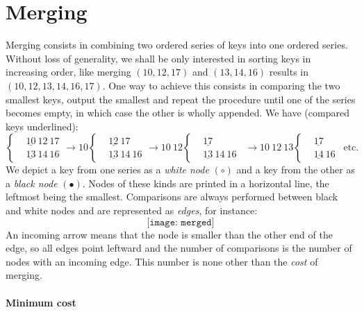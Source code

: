 \section{Merging}

Merging consists in combining two ordered series of keys into one
ordered series. Without loss of generality, we shall be only
interested in sorting keys in increasing order, like merging
\((10,12,17)\) and \((13,14,16)\) results in
\((10,12,13,14,16,17)\). One way to achieve this consists in comparing
the two smallest keys, output the smallest and repeat the procedure
until one of the series becomes empty, in which case the other is
wholly appended. We have (compared keys underlined):
\begin{equation*}
\left\{
\begin{aligned}
&\underline{10}~12~17\\
&\underline{13}~14~16
\end{aligned}
\right.
\rightarrow 10
\left\{
\begin{aligned}
&\underline{12}~17\\
&\underline{13}~14~16
\end{aligned}
\right.
\rightarrow 10~12
\left\{
\begin{aligned}
&\underline{17}\\
&\underline{13}~14~16
\end{aligned}
\right.
\;\,\rightarrow 10~12~13
\left\{
\begin{aligned}
&\underline{17}\\
&\underline{14}~16
\end{aligned}
\right.
\;\,\text{etc.}
\end{equation*}
We depict a key from one series as a \emph{white node} \((\circ)\) and
a key from the other as a \emph{black node} \((\bullet)\). Nodes of
these kinds are printed in a horizontal line, the leftmost being the
smallest. Comparisons are always performed between black and white
nodes and are represented as \emph{edges}, for instance:
\begin{equation}
\texttt{[image: merged]}\label{fig:merged}
\end{equation}
An incoming arrow means that the node is smaller than the other end of the edge, so all edges point leftward and the number of comparisons is the number of nodes with an incoming edge. This number is none other than the \emph{cost} of merging.

\paragraph{Minimum cost}
\label{merge:best_case}


